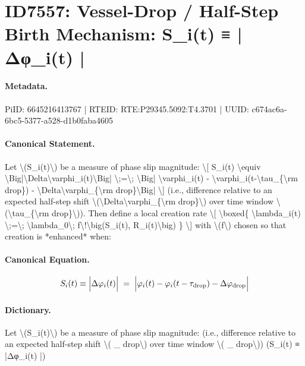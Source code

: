 \section*{ID7557: Vessel-Drop / Half-Step Birth Mechanism: S\_i(t) ≡ |Δφ\_i(t) |}
\paragraph{Metadata.}
PiID: 6645216413767 | RTEID: RTE:P29345.5092:T4.3701 | UUID: c674ac6a-6bc5-5377-a528-d1b0faba4605

\paragraph{Canonical Statement.}
Let \textbackslash{}(S\_i(t)\textbackslash{}) be a measure of phase slip magnitude: \textbackslash{}[ S\_i(t) \textbackslash{}equiv \textbackslash{}Big|\textbackslash{}Delta\textbackslash{}varphi\_i(t)\textbackslash{}Big| \textbackslash{};=\textbackslash{}; \textbackslash{}Big| \textbackslash{}varphi\_i(t) - \textbackslash{}varphi\_i(t-\textbackslash{}tau\_\{\textbackslash{}rm drop\}) - \textbackslash{}Delta\textbackslash{}varphi\_\{\textbackslash{}rm drop\}\textbackslash{}Big| \textbackslash{}] (i.e., difference relative to an expected half-step shift \textbackslash{}(\textbackslash{}Delta\textbackslash{}varphi\_\{\textbackslash{}rm drop\}\textbackslash{}) over time window \textbackslash{}(\textbackslash{}tau\_\{\textbackslash{}rm drop\}\textbackslash{})). Then define a local creation rate \textbackslash{}[ \textbackslash{}boxed\{ \textbackslash{}lambda\_i(t) \textbackslash{};=\textbackslash{}; \textbackslash{}lambda\_0\textbackslash{}; f\textbackslash{}!\textbackslash{}big(S\_i(t), R\_i(t)\textbackslash{}big) \} \textbackslash{}] with \textbackslash{}(f\textbackslash{}) chosen so that creation is *enhanced* when:

\paragraph{Canonical Equation.}
\[
S_i(t) \equiv \Big|\Delta\varphi_i(t)\Big| \;=\; \Big| \varphi_i(t) - \varphi_i(t-\tau_{\rm drop}) - \Delta\varphi_{\rm drop}\Big|
\]

\paragraph{Dictionary.}
Let \textbackslash{}(S\_i(t)\textbackslash{}) be a measure of phase slip magnitude: (i.e., difference relative to an expected half-step shift \textbackslash{}( \_ drop\textbackslash{}) over time window \textbackslash{}( \_ drop\textbackslash{})) (S\_i(t) ≡ |Δφ\_i(t) |)


